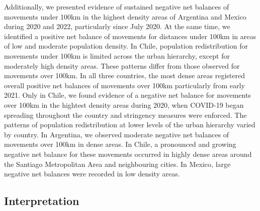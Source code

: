 \documentclass[
  11pt,
]{article}
\begin{document}
Additionally, we presented evidence of sustained negative net balances
of movements under 100km in the highest density areas of Argentina and
Mexico during 2020 and 2022, particularly since July 2020. At the same
time, we identified a positive net balance of movements for distances
under 100km in areas of low and moderate population density. In Chile,
population redistribution for movements under 100km is limited across
the urban hierarchy, except for moderately high density areas. These
patterns differ from those observed for movements over 100km. In all
three countries, the most dense areas registered overall positive net
balances of movements over 100km particularly from early 2021. Only in
Chile, we found evidence of a negative net balance for movements over
100km in the hightest density areas during 2020, when COVID-19 began
spreading throughout the country and stringency measures were enforced.
The patterns of population redistribution at lower levels of the urban
hierarchy varied by country. In Argentina, we observed moderate negative
net balances of movements over 100km in dense areas. In Chile, a
pronounced and growing negative net balance for these movements occurred
in highly dense areas around the Santiago Metropolitan Area and
neighbouring cities. In Mexico, large negative net balances were
recorded in low density areas.

\hypertarget{interpretation}{%
\subsection{Interpretation}\label{interpretation}}
\end{document}
